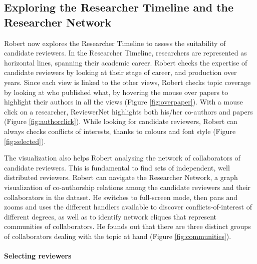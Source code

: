 \subsection*{Exploring the Researcher Timeline and the Researcher Network} 
 
Robert now explores the Researcher Timeline to assess the suitability of candidate reviewers. In the Researcher Timeline, researchers are represented as horizontal lines, spanning their academic career. Robert checks the expertise of candidate reviewers by looking at their stage of career, and production over years. Since each view is linked to the other views, Robert checks topic coverage by looking at who published what, by hovering the mouse over papers to highlight their authors in all the views (Figure \ref{fig:overpaper}). With a mouse click on a researcher, ReviewerNet highlights both his/her co-authors and papers (Figure \ref{fig:authorclick}).
While looking for candidate reviewers, Robert can always checks conflicts of interests, thanks to colours and font style (Figure \ref{fig:selected}). 

The visualization also helps Robert analysing the network of collaborators of candidate reviewers. This is fundamental to find sets of independent, well distributed reviewers. Robert can navigate the Researcher Network, a graph visualization of co-authorship relations among the candidate reviewers and their collaborators in the dataset. He switches to full-screen mode, then pans and zooms and uses the different handlers available to discover conflicts-of-interest of different degrees, as well as to identify network cliques that represent communities of collaborators. He founds out that there are three distinct groups of collaborators dealing with the topic at hand (Figure \ref{fig:communities}).


\paragraph*{Selecting reviewers} 

